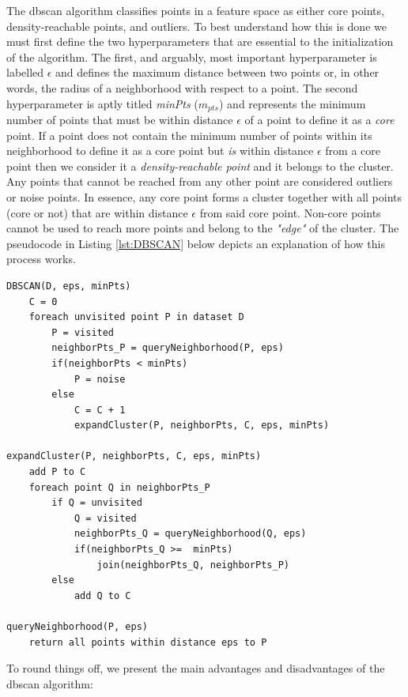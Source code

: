 \noindent \newline The \gls{dbscan} algorithm classifies points in a feature space as either core points, density-reachable points, and outliers. To best understand how this is done we must first define the two hyperparameters that are essential to the initialization of the algorithm. The first, and arguably, most important hyperparameter is labelled $\epsilon$ and defines the maximum distance between two points or, in other words, the radius of a neighborhood with respect to a point. The second hyperparameter is aptly titled \textit{minPts} ($m_{pts}$) and represents the minimum number of points that must be within distance $\epsilon$ of a point to define it as a \textit{core} point. If a point does not contain the minimum number of points within its neighborhood to define it as a core point but \textit{is} within distance $\epsilon$ from a core point then we consider it a \textit{density-reachable point} and it belongs to the cluster. Any points that cannot be reached from any other point are considered outliers or noise points. In essence, any core point forms a cluster together with all points (core or not) that are within distance $\epsilon$ from said core point. Non-core points cannot be used to reach more points and belong to the \textit{"edge"} of the cluster. The pseudocode in Listing \ref{lst:DBSCAN} below depicts an explanation of how this process works.

\noindent \newline \begin{lstlisting}[float=hbt!, frame=tb, caption={The \gls{dbscan} algorithm.},label=lst:DBSCAN]
DBSCAN(D, eps, minPts)
    C = 0
    foreach unvisited point P in dataset D
        P = visited
        neighborPts_P = queryNeighborhood(P, eps)
        if(neighborPts < minPts)
            P = noise
        else
            C = C + 1
            expandCluster(P, neighborPts, C, eps, minPts)

expandCluster(P, neighborPts, C, eps, minPts)
    add P to C
    foreach point Q in neighborPts_P
        if Q = unvisited
            Q = visited
            neighborPts_Q = queryNeighborhood(Q, eps)
            if(neighborPts_Q >=  minPts)
                join(neighborPts_Q, neighborPts_P)
        else
            add Q to C
            
queryNeighborhood(P, eps)
    return all points within distance eps to P
\end{lstlisting}

\noindent To round things off, we present the main advantages and disadvantages of the \gls{dbscan} algorithm:

